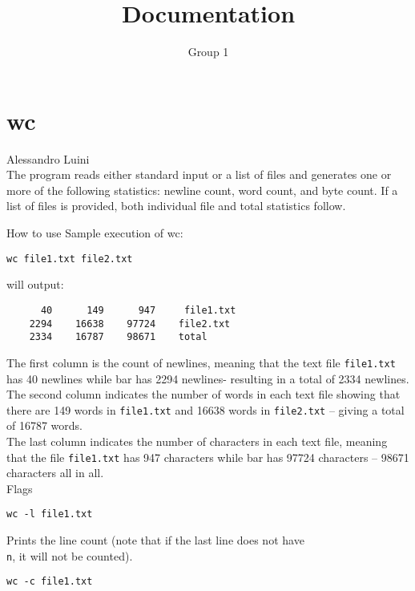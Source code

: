 \documentclass[hidelinks,12pt,a4paper,numbers=enddot]{scrartcl}
\title{Documentation}
\author{Group 1}
\begin{document}
\maketitle
\tableofcontents
\newpage

\section{wc}


\large Alessandro Luini \normalsize\\


The program reads either standard input or a list of files and
generates one or more of the following statistics: newline count,
word count, and byte count. If a list of files is provided, both
individual file and total statistics follow.

How to use
Sample execution of wc:

\begin{verbatim}
wc file1.txt file2.txt
\end{verbatim}

will output:

\begin{verbatim}
      40      149      947     file1.txt
    2294    16638    97724    file2.txt
    2334    16787    98671    total
\end{verbatim}

The first column is the count of newlines, meaning that the text file
\texttt{file1.txt} has 40 newlines while bar has 2294 newlines-
resulting in a total of 2334 newlines. The second column indicates the
number of words in each text file showing that there are 149 words in \texttt{file1.txt}
and 16638 words in \texttt{file2.txt} – giving a total of 16787 words.\\
The last column indicates the number of characters in each text file, meaning that the file
\texttt{file1.txt} has 947 characters while bar has 97724 characters – 98671
characters all in all.\\

Flags

\begin{verbatim}
wc -l file1.txt
\end{verbatim}

Prints the line count (note that if the last line does not have \texttt{\\n},
it will not be counted).

\begin{verbatim}
wc -c file1.txt
\end{verbatim}
\end{document}
